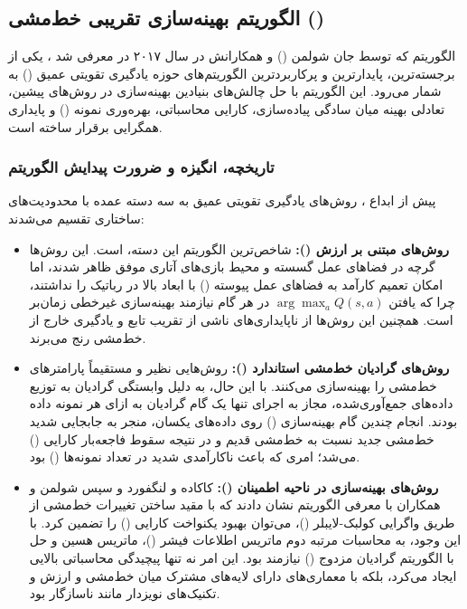 \subsection{الگوریتم بهینه‌سازی تقریبی خط‌مشی ()}

الگوریتم  که توسط جان شولمن () و همکارانش در سال ۲۰۱۷ در  معرفی شد \cite{schulman2017proximal}، یکی از برجسته‌ترین، پایدارترین و پرکاربردترین الگوریتم‌های حوزه یادگیری تقویتی عمیق () به شمار می‌رود. این الگوریتم با حل چالش‌های بنیادین بهینه‌سازی در روش‌های پیشین، تعادلی بهینه میان سادگی پیاده‌سازی، کارایی محاسباتی، بهره‌وری نمونه () و پایداری همگرایی برقرار ساخته است.

\subsubsection*{تاریخچه، انگیزه و ضرورت پیدایش الگوریتم}

پیش از ابداع ، روش‌های یادگیری تقویتی عمیق به سه دسته عمده با محدودیت‌های ساختاری تقسیم می‌شدند:
\begin{itemize}
    \item \textbf{روش‌های مبتنی بر ارزش ():} شاخص‌ترین الگوریتم این دسته،  \cite{mnih2015human} است. این روش‌ها گرچه در فضاهای عمل گسسته و محیط بازی‌های آتاری \cite{bellemare2015arcade} موفق ظاهر شدند، اما امکان تعمیم کارآمد به فضاهای عمل پیوسته () با ابعاد بالا در رباتیک \cite{brockman2016openai, duan2016benchmarking} را نداشتند، چرا که یافتن $\arg\max_a Q(s, a)$ در هر گام نیازمند بهینه‌سازی غیرخطی زمان‌بر است. همچنین این روش‌ها از ناپایداری‌های ناشی از تقریب تابع و یادگیری خارج از خط‌مشی رنج می‌برند.
    \item \textbf{روش‌های گرادیان خط‌مشی استاندارد ():} روش‌هایی نظیر  \cite{williams1992simple} و  \cite{mnih2016asynchronous} مستقیماً پارامترهای خط‌مشی را بهینه‌سازی می‌کنند. با این حال، به دلیل وابستگی گرادیان به توزیع داده‌های جمع‌آوری‌شده، مجاز به اجرای تنها یک گام گرادیان به ازای هر نمونه داده بودند. انجام چندین گام بهینه‌سازی () روی داده‌های یکسان، منجر به جابجایی شدید خط‌مشی جدید نسبت به خط‌مشی قدیم و در نتیجه سقوط فاجعه‌بار کارایی () می‌شد؛ امری که باعث ناکارآمدی شدید در تعداد نمونه‌ها () بود.
    \item \textbf{روش‌های بهینه‌سازی در ناحیه اطمینان ():} کاکاده و لنگفورد \cite{kakade2002approximately} و سپس شولمن و همکاران با معرفی الگوریتم  \cite{schulman2015trust} نشان دادند که با مقید ساختن تغییرات خط‌مشی از طریق واگرایی کولبک-لایبلر ()، می‌توان بهبود یکنواخت کارایی () را تضمین کرد. با این وجود،  به محاسبات مرتبه دوم ماتریس اطلاعات فیشر ()، ماتریس هسین و حل با الگوریتم گرادیان مزدوج () نیازمند بود. این امر نه تنها پیچیدگی محاسباتی بالایی ایجاد می‌کرد، بلکه با معماری‌های دارای لایه‌های مشترک میان خط‌مشی و ارزش و تکنیک‌های نویزدار مانند  ناسازگار بود.
\end{itemize}

